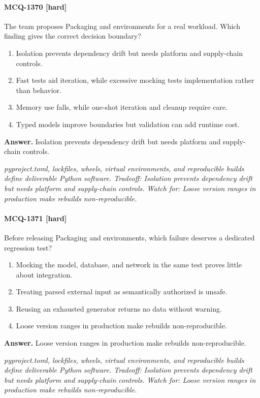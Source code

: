 \paragraph{MCQ-1370 [hard]} The team proposes Packaging and environments for a real workload. Which finding gives the correct decision boundary?
\begin{enumerate}[label=\Alph*.]
\item Isolation prevents dependency drift but needs platform and supply-chain controls.
\item Fast tests aid iteration, while excessive mocking tests implementation rather than behavior.
\item Memory use falls, while one-shot iteration and cleanup require care.
\item Typed models improve boundaries but validation can add runtime cost.
\end{enumerate}
\noindent\textbf{Answer.} Isolation prevents dependency drift but needs platform and supply-chain controls.
\par\textit{pyproject.toml, lockfiles, wheels, virtual environments, and reproducible builds define deliverable Python software. Tradeoff: Isolation prevents dependency drift but needs platform and supply-chain controls. Watch for: Loose version ranges in production make rebuilds non-reproducible.}
\paragraph{MCQ-1371 [hard]} Before releasing Packaging and environments, which failure deserves a dedicated regression test?
\begin{enumerate}[label=\Alph*.]
\item Mocking the model, database, and network in the same test proves little about integration.
\item Treating parsed external input as semantically authorized is unsafe.
\item Reusing an exhausted generator returns no data without warning.
\item Loose version ranges in production make rebuilds non-reproducible.
\end{enumerate}
\noindent\textbf{Answer.} Loose version ranges in production make rebuilds non-reproducible.
\par\textit{pyproject.toml, lockfiles, wheels, virtual environments, and reproducible builds define deliverable Python software. Tradeoff: Isolation prevents dependency drift but needs platform and supply-chain controls. Watch for: Loose version ranges in production make rebuilds non-reproducible.}
